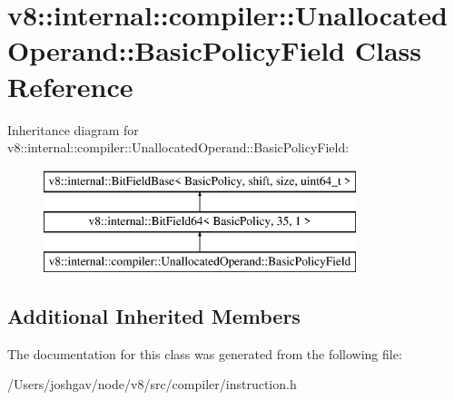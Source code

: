 \hypertarget{classv8_1_1internal_1_1compiler_1_1_unallocated_operand_1_1_basic_policy_field}{}\section{v8\+:\+:internal\+:\+:compiler\+:\+:Unallocated\+Operand\+:\+:Basic\+Policy\+Field Class Reference}
\label{classv8_1_1internal_1_1compiler_1_1_unallocated_operand_1_1_basic_policy_field}
Inheritance diagram for v8\+:\+:internal\+:\+:compiler\+:\+:Unallocated\+Operand\+:\+:Basic\+Policy\+Field\+:\begin{figure}[H]
\begin{center}
\leavevmode
\includegraphics[height=3.000000cm]{classv8_1_1internal_1_1compiler_1_1_unallocated_operand_1_1_basic_policy_field}
\end{center}
\end{figure}
\subsection*{Additional Inherited Members}


The documentation for this class was generated from the following file\+:\begin{DoxyCompactItemize}
\item 
/\+Users/joshgav/node/v8/src/compiler/instruction.\+h\end{DoxyCompactItemize}
